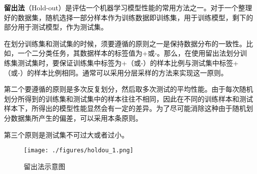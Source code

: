 
\textbf{留出法}（Hold-out）是评估一个机器学习模型性能的常用方法之一。对于一个整理好的数据集，随机选择一部分样本作为训练数据即训练集，用于训练模型，剩下的部分用于测试模型，作为测试集。

在划分训练集和测试集的时候，须要遵循的原则之一是保持数据分布的一致性。比如，一个二分类任务，其数据样本的标签值为+或-。那么，在使用留出法划分训练集测试集时，要保证训练集中标签为+（或-）的样本比例与测试集中标签+（或-）的样本比例相同。通常可以采用分层采样的方法来实现这一原则。

第二个要遵循的原则是多次反复划分，然后取多次测试的平均性能。由于每次随机划分所得到的训练集和测试集中的样本往往不相同，因此在不同的训练样本和测试样本下，所得出的模型性能显然会有一定的差异。为了尽可能消除这种由于随机划分数据集所产生的偏差，可以采用本条原则。

第三个原则是测试集不可过大或者过小。


\begin{figure}[ht]
\centering
\texttt{[image: ./figures/holdou\_1.png]}
\caption{留出法示意图} \label{holdou_fig1}
\end{figure}